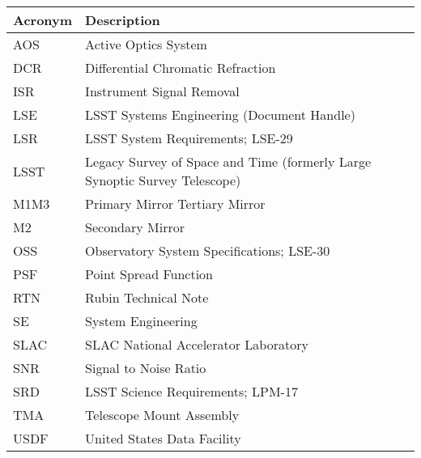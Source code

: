 \addtocounter{table}{-1}
\begin{longtable}{p{}p{}}\hline
\textbf{Acronym} & \textbf{Description}  \\\hline

AOS & Active Optics System \\\hline
DCR & Differential Chromatic Refraction \\\hline
ISR & Instrument Signal Removal \\\hline
LSE & LSST Systems Engineering (Document Handle) \\\hline
LSR & LSST System Requirements; LSE-29 \\\hline
LSST & Legacy Survey of Space and Time (formerly Large Synoptic Survey Telescope) \\\hline
M1M3 & Primary Mirror Tertiary Mirror \\\hline
M2 & Secondary Mirror \\\hline
OSS & Observatory System Specifications; LSE-30 \\\hline
PSF & Point Spread Function \\\hline
RTN & Rubin Technical Note \\\hline
SE & System Engineering \\\hline
SLAC & SLAC National Accelerator Laboratory \\\hline
SNR & Signal to Noise Ratio \\\hline
SRD & LSST Science Requirements; LPM-17 \\\hline
TMA & Telescope Mount Assembly \\\hline
USDF & United States Data Facility \\\hline
\end{longtable}
